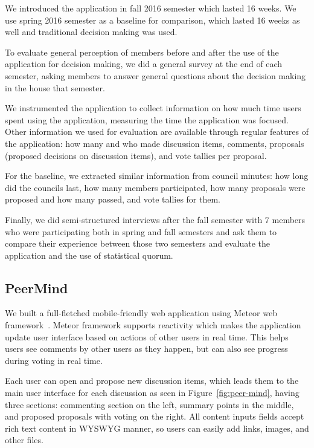 \documentclass[format=acmsmall, review=true, screen=true, anonymous=true]{acmart}
\begin{document}
We introduced the application in fall 2016 semester which lasted 16 weeks. We use spring 2016 semester as
a baseline for comparison, which lasted 16 weeks as well and traditional decision making was used.

To evaluate general perception of members before and after the use of the application for decision making,
we did a general survey at the end of each semester, asking members to answer general questions about the
decision making in the house that semester.

We instrumented the application to collect information on how much time users spent using the application,
measuring the time the application was focused. Other information we used for evaluation are available
through regular features of the application: how many and who made discussion items, comments, proposals
(proposed decisions on discussion items), and vote tallies per proposal.

For the baseline, we extracted similar information from council minutes: how long did the councils last,
how many members participated, how many proposals were proposed and how many passed, and vote tallies for them.

Finally, we did semi-structured interviews after the fall semester with 7 members who were participating
both in spring and fall semesters and ask them to compare their experience between those two semesters and
evaluate the application and the use of statistical quorum.

\subsection{PeerMind}
\label{sec:peermind}

We built a full-fletched mobile-friendly web application using Meteor web framework~\cite{meteor}.
Meteor framework supports reactivity which makes the application update user interface based on actions
of other users in real time. This helps users see comments by other users as they happen, but can also see
progress during voting in real time.

Each user can open and propose new discussion items, which leads them to the main user interface for each discussion as seen in Figure~\ref{fig:peer-mind}, having three sections: commenting section on the left, summary points in the middle,
and proposed proposals with voting on the right. All content inputs fields accept rich text content in WYSWYG manner,
so users can easily add links, images, and other files.
\end{document}
